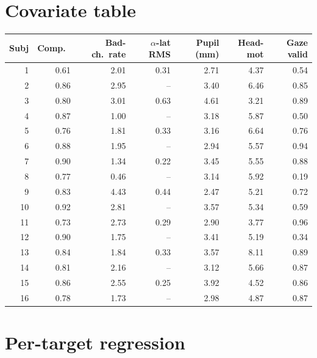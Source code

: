 \section{Covariate table}

\begin{table}[ht]
\centering
\small
\begin{tabular}{rrrrrrr}
\toprule
Subj & Comp.\ & Bad-ch.\ rate & $\alpha$-lat RMS & Pupil (mm) & Head-mot & Gaze valid \\
\midrule
1  & 0.61 & 2.01 & 0.31 & 2.71 & 4.37 & 0.54 \\
2  & 0.86 & 2.95 & --   & 3.40 & 6.46 & 0.85 \\
3  & 0.80 & 3.01 & 0.63 & 4.61 & 3.21 & 0.89 \\
4  & 0.87 & 1.00 & --   & 3.18 & 5.87 & 0.50 \\
5  & 0.76 & 1.81 & 0.33 & 3.16 & 6.64 & 0.76 \\
6  & 0.88 & 1.95 & --   & 2.94 & 5.57 & 0.94 \\
7  & 0.90 & 1.34 & 0.22 & 3.45 & 5.55 & 0.88 \\
8  & 0.77 & 0.46 & --   & 3.14 & 5.92 & 0.19 \\
9  & 0.83 & 4.43 & 0.44 & 2.47 & 5.21 & 0.72 \\
10 & 0.92 & 2.81 & --   & 3.57 & 5.34 & 0.59 \\
11 & 0.73 & 2.73 & 0.29 & 2.90 & 3.77 & 0.96 \\
12 & 0.90 & 1.75 & --   & 3.41 & 5.19 & 0.34 \\
13 & 0.84 & 1.84 & 0.33 & 3.57 & 8.11 & 0.89 \\
14 & 0.81 & 2.16 & --   & 3.12 & 5.66 & 0.87 \\
15 & 0.86 & 2.55 & 0.25 & 3.92 & 4.52 & 0.86 \\
16 & 0.78 & 1.73 & --   & 2.98 & 4.87 & 0.87 \\
\bottomrule
\end{tabular}
\end{table}

\section{Per-target regression}

